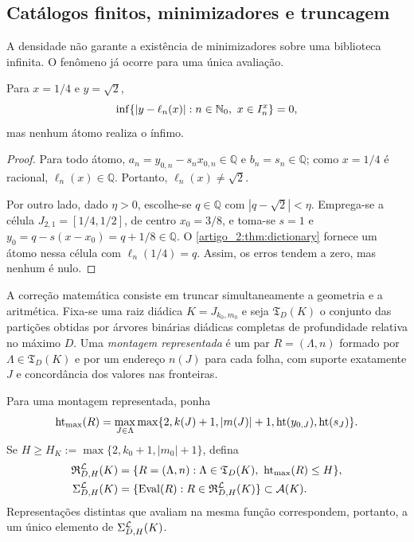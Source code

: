 \subsection{Catálogos finitos, minimizadores e truncagem}

A densidade não garante a existência de minimizadores sobre uma biblioteca
infinita. O fenômeno já ocorre para uma única avaliação.

\begin{proposition}\label{map:artigo_2:3.21}\label{artigo_2:prop:no-minimizer}
Para $x=1/4$ e $y=\sqrt2$,
\[
 \inf\{|y-\ell_n(x)|:n\in\mathbb{N}_0,\ x\in I_n^x\}=0,
\]
mas nenhum átomo realiza o ínfimo.
\end{proposition}

\begin{proof}
Para todo átomo, $a_n=y_{0,n}-s_nx_{0,n}\in\mathbb{Q}$ e
$b_n=s_n\in\mathbb{Q}$; como $x=1/4$ é racional,
$\ell_n(x)\in\mathbb{Q}$. Portanto, $\ell_n(x)\neq\sqrt2$.

Por outro lado, dado $\eta>0$, escolhe-se $q\in\mathbb{Q}$ com
$|q-\sqrt2|<\eta$. Emprega-se a célula $J_{2,1}=[1/4,1/2]$, de centro $x_0=3/8$,
e toma-se $s=1$ e $y_0=q-s(x-x_0)=q+1/8\in\mathbb{Q}$. O
\cref{artigo_2:thm:dictionary} fornece um átomo nessa célula com
$\ell_n(1/4)=q$. Assim, os erros tendem a zero, mas nenhum é nulo.
\end{proof}

A correção matemática consiste em truncar simultaneamente a geometria e a aritmética. Fixa-se
uma raiz diádica $K=J_{k_0,m_0}$ e seja $\mathfrak T_D(K)$ o conjunto das
partições obtidas por árvores binárias diádicas completas de profundidade
relativa no máximo $D$. Uma \emph{montagem representada} é um par
$R=(\Lambda,n)$ formado por $\Lambda\in\mathfrak T_D(K)$ e por um endereço
$n(J)$ para cada folha, com suporte exatamente $J$ e concordância dos valores
nas fronteiras.

\begin{definition}\label{map:artigo_2:3.22}\label{artigo_2:def:finite-catalog}
Para uma montagem representada, ponha
\[
 \operatorname{ht}_{\max}(R)=\max_{J\in\Lambda}
 \max\{2,k(J)+1,|m(J)|+1,\operatorname{ht}(y_{0,J}),\operatorname{ht}(s_J)\}.
\]
Se
$H\ge H_K:=\max\{2,k_0+1,|m_0|+1\}$, defina
\begin{align}
 \mathfrak R_{D,H}^{\mathcal{L}}(K)
   &=\{R=(\Lambda,n):\Lambda\in\mathfrak T_D(K),\
       \operatorname{ht}_{\max}(R)\le H\},\label{artigo_2:eq:represented-catalog}\\
 \Sigma_{D,H}^{\mathcal{L}}(K)
   &=\{\operatorname{Eval}(R):R\in
       \mathfrak R_{D,H}^{\mathcal{L}}(K)\}\subset\mathcal{A}(K).
 \label{artigo_2:eq:finite-catalog}
\end{align}
Representações distintas que avaliam na mesma função correspondem, portanto,
a um único elemento de $\Sigma_{D,H}^{\mathcal{L}}(K)$.
\end{definition}

